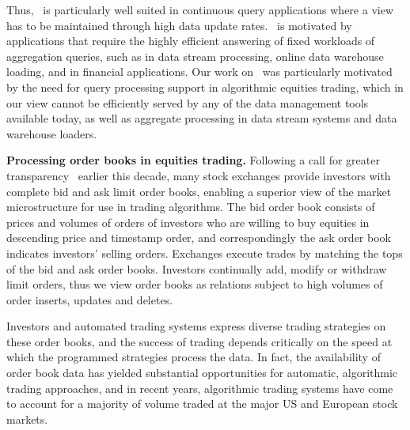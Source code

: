 Thus, \compiler\ is particularly well suited in continuous query applications
where a view has to be maintained through high data update rates. \compiler\ is
motivated  by  applications  that  require  the  highly efficient answering of
fixed workloads of aggregation queries, such as in  data stream  processing,
online data  warehouse  loading, and  in financial applications. Our work on
\compiler\ was particularly motivated by the need for query processing support in
algorithmic equities trading, which in our view cannot be efficiently served by
any of the data management tools available today, as well as aggregate processing
in data stream systems and data warehouse loaders.


\medskip


\textbf{Processing order books in equities trading.}
Following a call for greater transparency~\cite{sec-orderbook:00} earlier this
decade, many stock exchanges provide investors with complete bid and ask limit
order books, enabling a superior view of the market microstructure for use in
trading algorithms. The bid order book consists of prices and volumes of orders
of investors who are willing to buy equities in descending price and timestamp
order, and correspondingly the ask order book indicates investors' selling
orders. Exchanges execute trades by matching the tops of the bid and ask order
books. Investors continually add, modify or withdraw limit orders, thus we view
order books as relations subject to high volumes of order inserts, updates and
deletes.

Investors and automated trading systems express diverse trading strategies on
these order books, and the success of trading depends critically on the speed at
which the programmed strategies process the data.
In fact, the availability of order book data has yielded substantial
opportunities for automatic, algorithmic trading approaches, and in recent years,
algorithmic trading systems have come to account for a majority of volume traded
at the major US and European stock markets.

